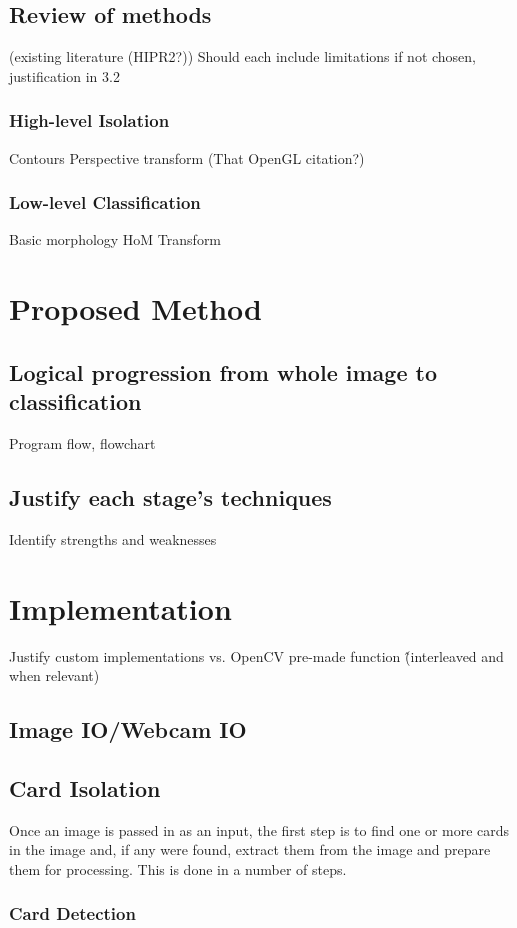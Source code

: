 \documentclass[a4paper,12pt,notitlepage]{article}
\begin{document}
	\subsection{Review of methods}
		(existing literature (HIPR2?))
		Should each include limitations if not chosen, justification in 3.2
		\subsubsection{High-level Isolation}
			Contours
			Perspective transform (That OpenGL citation?)
		\subsubsection{Low-level Classification}
			Basic morphology
			HoM Transform
\pagebreak
\section{Proposed Method}
	\subsection{Logical progression from whole image to classification}
		Program flow, flowchart
	\subsection{Justify each stage’s techniques}
		Identify strengths and weaknesses
\pagebreak
\section{Implementation}
	Justify custom implementations vs. OpenCV pre-made function
	\^(interleaved and when relevant)
	\subsection{Image IO/Webcam IO}
	\subsection{Card Isolation}

		Once an image is passed in as an input, the first step is to find one or more cards in the image and, if any were found, extract them from the image and prepare them for processing. This is done in a number of steps.

		\subsubsection{Card Detection}
\end{document}
